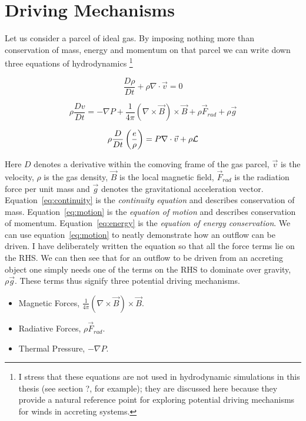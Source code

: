 \section{Driving Mechanisms}

Let us consider a parcel of ideal gas. By imposing nothing more than
conservation of mass, energy and momentum on that parcel we can write down
three equations of hydrodynamics
\footnote{I stress that these equations are not used in hydrodynamic
simulations in this thesis (see section ?, for example); 
they are discussed here because they provide a natural reference point
for exploring potential driving mechanisms for winds in accreting systems.
}

\begin{equation}
\label{eq:continuity}
\frac{D \rho}{Dt} + \rho \nabla \cdot \vec{v} = 0
\end{equation}

\begin{equation}
\label{eq:motion}
\rho \frac{Dv}{Dt} = -\nabla P + \frac{1}{4 \pi}(\nabla \times \vec{B}) \times \vec{B} + \rho \vec{F}_{rad} + \rho \vec{g}
\end{equation}

\begin{equation}
\label{eq:energy}
\rho \frac{D}{Dt} \left(\frac{e}{\rho}\right) = P \nabla \cdot \vec{v} + \rho \cal{L}
\end{equation}

Here $D$ denotes a derivative within the comoving frame of the gas parcel, $\vec{v}$ is the velocity,
$\rho$ is the gas density, $\vec{B}$ is the local magnetic field, $\vec{F}_{rad}$ is the radiation
force per unit mass and $\vec{g}$ denotes the gravitational acceleration vector.
Equation~\ref{eq:continuity} is the {\em continuity equation} and describes conservation of mass. 
Equation~\ref{eq:motion} is the {\em equation of motion} and describes conservation of momentum.
Equation~\ref{eq:energy} is the {\em equation of energy conservation}. 
We can use equation~\ref{eq:motion} to neatly demonstrate how an outflow can be driven. I have 
deliberately written the equation so that all the force terms lie on the RHS. We can then see that
for an outflow to be driven from an accreting object one simply needs one of the terms on
the RHS to dominate over gravity, $\rho \vec{g}$. These terms thus signify three potential
driving mechanisms.

\begin{itemize}
	\item Magnetic Forces, $\frac{1}{4 \pi}(\nabla \times \vec{B}) \times \vec{B}$.
	\item Radiative Forces, $\rho \vec{F}_{rad}$.
	\item Thermal Pressure, $-\nabla P$.
\end{itemize}

